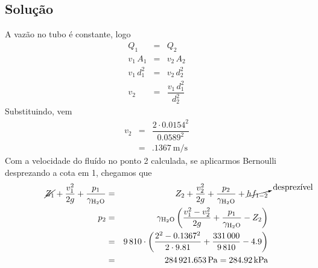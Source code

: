 \documentclass[a4paper, 12pt, brazilian]{article}
\begin{document}
	\subsection{Solução}
	A vazão no tubo é constante, logo
	\begin{eqnarray}
		Q_{1}&=&Q_{2}\\
		v_{1}\,A_{1}&=&v_{2}\,A_{2}\\
		v_{1}\,d_{1}^{2}&=&v_{2}\,d_{2}^{2}\\
		v_{2}&=&\dfrac{v_{1}\,d_{1}^{2}}{d_{2}^{2}}
	\end{eqnarray}
	Substituindo, vem
	\begin{eqnarray}
		v_{2}&=&\dfrac{2\cdot 0.0154^{2}}{0.0589^{2}}\\
			 &=&\SI{.1367}{\meter/\second}
	\end{eqnarray}
	Com a velocidade do fluído no ponto 2 calculada, se aplicarmos Bernoulli des\-prezando a cota em 1, chegamos que
	\begin{eqnarray}
		\cancel{Z_{1}}+\dfrac{v_{1}^{2}}{2g}+\dfrac{p_{1}}{\gamma_{\ce{H2O}}}&=&Z_{2}+\dfrac{v_{2}^{2}}{2g}+\dfrac{p_{2}}{\gamma_{\ce{H2O}}}+\cancelto{\textrm{desprezível}}{hf_{1-2}}\\
		p_{2}&=&\gamma_{\ce{H2O}}\left(\dfrac{v_{1}^{2}-v_{2}^{2}}{2g}+\dfrac{p_{1}}{\gamma_{\ce{H2O}}}-Z_{2}\right)\\
			 &=&9\,810\cdot\left(\dfrac{2^{2}-0.1367^{2}}{2\cdot 9.81}+\dfrac{331\,000}{9\,810}-4.9\right)\\
			 &=&\SI{284921.653}{\pascal}=\SI{284.92}{\kilo\pascal}
	\end{eqnarray}
\end{document}
